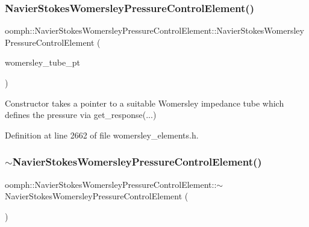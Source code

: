 \subsubsection{\texorpdfstring{Navier\+Stokes\+Womersley\+Pressure\+Control\+Element()}{NavierStokesWomersleyPressureControlElement()}}
{\footnotesize\ttfamily oomph\+::\+Navier\+Stokes\+Womersley\+Pressure\+Control\+Element\+::\+Navier\+Stokes\+Womersley\+Pressure\+Control\+Element (\begin{DoxyParamCaption}\item[{\hyperlink{classoomph_1_1TemplateFreeWomersleyImpedanceTubeBase}{Template\+Free\+Womersley\+Impedance\+Tube\+Base} $\ast$}]{womersley\+\_\+tube\+\_\+pt }\end{DoxyParamCaption})\hspace{0.3cm}{\ttfamily [inline]}}



Constructor takes a pointer to a suitable Womersley impedance tube which defines the pressure via get\+\_\+response(...) 



Definition at line 2662 of file womersley\+\_\+elements.\+h.

\mbox{\label{classoomph_1_1NavierStokesWomersleyPressureControlElement_aaa4bdb2c63aea8177b120f39a309b645}} 
\subsubsection{\texorpdfstring{$\sim$\+Navier\+Stokes\+Womersley\+Pressure\+Control\+Element()}{~NavierStokesWomersleyPressureControlElement()}}
{\footnotesize\ttfamily oomph\+::\+Navier\+Stokes\+Womersley\+Pressure\+Control\+Element\+::$\sim$\+Navier\+Stokes\+Womersley\+Pressure\+Control\+Element (\begin{DoxyParamCaption}{ }\end{DoxyParamCaption})\hspace{0.3cm}{\ttfamily [inline]}}



